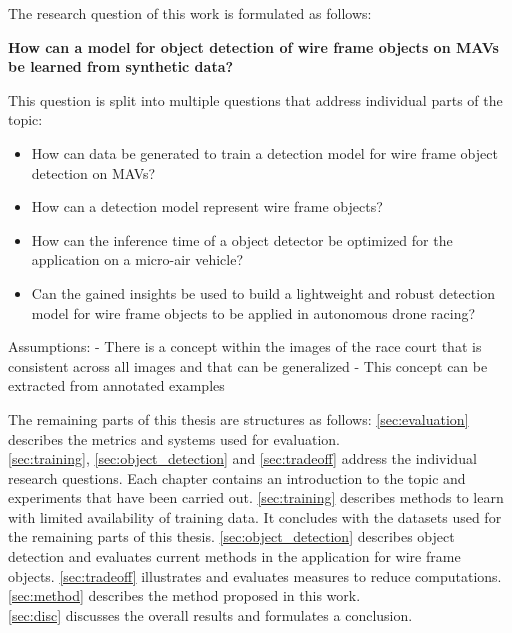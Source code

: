 The research question of this work is formulated as follows:
\begin{center}
	\textbf{How can a model for object detection of wire frame objects on \acp{MAV} be learned from synthetic data?}
\end{center}


This question is split into multiple questions that address individual parts of the topic:

\begin{itemize}
	\item How can data be generated to train a detection model for wire frame object detection on \acp{MAV}?
	\item How can a detection model represent wire frame objects?
	\item How can the inference time of a object detector be optimized for the application on a micro-air vehicle?
	\item Can the gained insights be used to build a lightweight and robust detection model for wire frame objects to be applied in autonomous drone racing?
\end{itemize}

Assumptions:
- There is a concept within the images of the race court that is consistent across all images and that can be generalized
- This concept can be extracted from annotated examples

The remaining parts of this thesis are structures as follows: \autoref{sec:evaluation} describes the metrics and systems used for evaluation.\\
 \autoref{sec:training}, \autoref{sec:object_detection} and \autoref{sec:tradeoff} address the individual research questions. Each chapter contains an introduction to the topic and experiments that have been carried out. \autoref{sec:training} describes methods to learn with limited availability of training data. It concludes with the datasets used for the remaining parts of this thesis.  \autoref{sec:object_detection} describes object detection and evaluates current methods in the application for wire frame objects.
\autoref{sec:tradeoff} illustrates and evaluates measures to reduce computations.
\autoref{sec:method} describes the method proposed in this work.\\
\autoref{sec:disc} discusses the overall results and formulates a conclusion.

